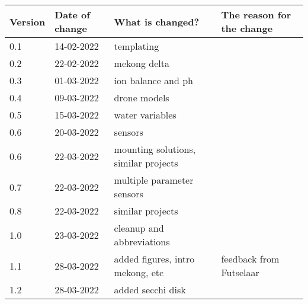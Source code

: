 \begin{tabular}{ | l | l | l | l |}
    \hline
    \textbf{Version} & \textbf{Date of change} & \textbf{What is changed?} & \textbf{The reason for the change} \\ \hline
    0.1 & 14-02-2022 & templating & \\
    0.2 & 22-02-2022 & mekong delta & \\
    0.3 & 01-03-2022 & ion balance and ph & \\
    0.4 & 09-03-2022 & drone models  & \\
    0.5 & 15-03-2022 & water variables & \\
    0.6 & 20-03-2022 & sensors  & \\
    0.6 & 22-03-2022 & mounting solutions, similar projects & \\
    0.7 & 22-03-2022 & multiple parameter sensors & \\
    0.8 & 22-03-2022 & similar projects & \\
    1.0 & 23-03-2022 & cleanup and abbreviations & \\
    1.1 & 28-03-2022 & added figures, intro mekong, etc & feedback from Futselaar \\
    1.2 & 28-03-2022 & added secchi disk & \\
    
    \hline
\end{tabular}